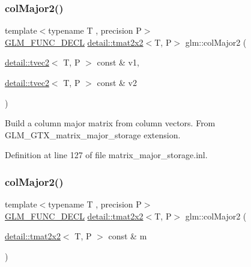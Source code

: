 \subsubsection{\texorpdfstring{col\+Major2()}{colMajor2()}\hspace{0.1cm}{\footnotesize\ttfamily [1/2]}}
{\footnotesize\ttfamily template$<$typename T , precision P$>$ \\
\hyperlink{setup_8hpp_ab2d052de21a70539923e9bcbf6e83a51}{G\+L\+M\+\_\+\+F\+U\+N\+C\+\_\+\+D\+E\+CL} \hyperlink{structglm_1_1detail_1_1tmat2x2}{detail\+::tmat2x2}$<$T, P$>$ glm\+::col\+Major2 (\begin{DoxyParamCaption}\item[{\hyperlink{structglm_1_1detail_1_1tvec2}{detail\+::tvec2}$<$ T, P $>$ const \&}]{v1,  }\item[{\hyperlink{structglm_1_1detail_1_1tvec2}{detail\+::tvec2}$<$ T, P $>$ const \&}]{v2 }\end{DoxyParamCaption})}

Build a column major matrix from column vectors. From G\+L\+M\+\_\+\+G\+T\+X\+\_\+matrix\+\_\+major\+\_\+storage extension. 

Definition at line 127 of file matrix\+\_\+major\+\_\+storage.\+inl.

\mbox{\label{group__gtx__matrix__major__storage_ga84d93f2dea8fd341232f0505038d50f6}} 
\subsubsection{\texorpdfstring{col\+Major2()}{colMajor2()}\hspace{0.1cm}{\footnotesize\ttfamily [2/2]}}
{\footnotesize\ttfamily template$<$typename T , precision P$>$ \\
\hyperlink{setup_8hpp_ab2d052de21a70539923e9bcbf6e83a51}{G\+L\+M\+\_\+\+F\+U\+N\+C\+\_\+\+D\+E\+CL} \hyperlink{structglm_1_1detail_1_1tmat2x2}{detail\+::tmat2x2}$<$T, P$>$ glm\+::col\+Major2 (\begin{DoxyParamCaption}\item[{\hyperlink{structglm_1_1detail_1_1tmat2x2}{detail\+::tmat2x2}$<$ T, P $>$ const \&}]{m }\end{DoxyParamCaption})}

